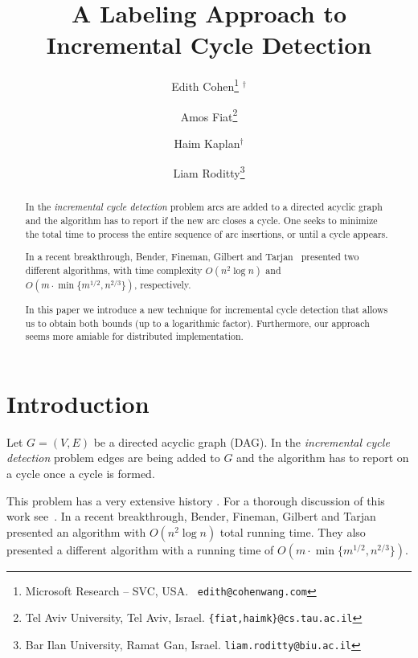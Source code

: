 \documentclass[11pt]{article}
\theoremstyle{plain}
\theoremstyle{definition}
\theoremstyle{remark}
\numberwithin{equation}{section}
\begin{document}
\title{A Labeling Approach to Incremental Cycle Detection}

\author{Edith Cohen\thanks{Microsoft Research -- SVC, USA. {\tt
      edith@cohenwang.com}} $^\dagger$  \and Amos Fiat\thanks{Tel Aviv
    University, Tel Aviv, Israel. {\tt  \{fiat,haimk\}@cs.tau.ac.il}}
\and Haim Kaplan$^\dagger$ \and Liam
Roditty\thanks{Bar Ilan University, Ramat Gan, Israel. {\tt liam.roditty@biu.ac.il}}}

\maketitle

\begin{abstract}
In the \emph{incremental cycle detection} problem arcs are added to
a directed acyclic graph and the algorithm has to report if the new
arc closes a cycle. One seeks to minimize the total time to process
the entire sequence of arc insertions, or until a cycle appears.

In a recent breakthrough, Bender, Fineman, Gilbert and
Tarjan~\cite{BeFiGiTa11} presented two different algorithms, with
time complexity  $O(n^2 \log n)$ and $O(m \cdot \min \{ m^{1/2},
n^{2/3} \})$, respectively.

In this paper we introduce a new technique for incremental cycle
detection that allows us to obtain both bounds (up to a logarithmic
factor). Furthermore, our approach seems more amiable for
distributed implementation.
\end{abstract}\textbf{}

\thispagestyle{empty}

\newpage
\setcounter{page}{1}


\section{Introduction}


Let $G=(V,E)$ be a directed acyclic graph (DAG). In the
\emph{incremental cycle detection} problem edges are being added to
$G$ and the algorithm has to report on a cycle once a cycle is
formed.

This problem has a very extensive history
\cite{AlpernHRSZ90,Marchetti-SpaccamelaNR96,PearceK06,KatrielB06,LiuC07,AjwaniFM08,AjwaniF10,DBLP:journals/corr/abs-0711-0251,HKMST:Talg12,BFG:SODA09}.
For a thorough discussion of this work see~\cite{HKMST:Talg12}.  In
a recent breakthrough, Bender, Fineman, Gilbert and
Tarjan~\cite{BeFiGiTa11} presented an algorithm with $O(n^2 \log n)$
total running time. They also presented a different algorithm with a
running time of $O(m \cdot \min \{ m^{1/2}, n^{2/3} \})$.
\end{document}
